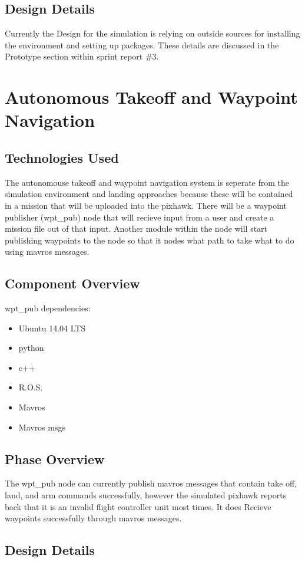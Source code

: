 \subsection{Design Details}
Currently the Design for the simulation is relying on outside sources for installing the environment and setting up packages. These details are discussed in the Prototype section within sprint report \#3.


\section{Autonomous Takeoff and Waypoint Navigation} 
\subsection{Technologies  Used}
The autonomouse takeoff and waypoint navigation system is seperate from the simulation environment and landing approaches because these will be contained in a mission that will be uploaded into the pixhawk. There will be a waypoint publisher (wpt\_pub) node that will recieve input from a user and create a mission file out of that input. Another module within the node will start publishing waypoints to the node so that it nodes what path to take what to do using mavros messages.
\subsection{Component  Overview}
wpt\_pub dependencies:
\begin{itemize}
  \item Ubuntu 14.04 LTS
  \item python
  \item c++
  \item R.O.S.
  \item Mavros
  \item Mavros msgs
\end{itemize}
\subsection{Phase Overview}
The wpt\_pub node can currently publish mavros messages that contain take off, land, and arm commands successfully, however the simulated pixhawk reports back that it is an invalid flight controller unit most times. It does Recieve waypoints successfully through mavros messages.
\subsection{Design Details}




